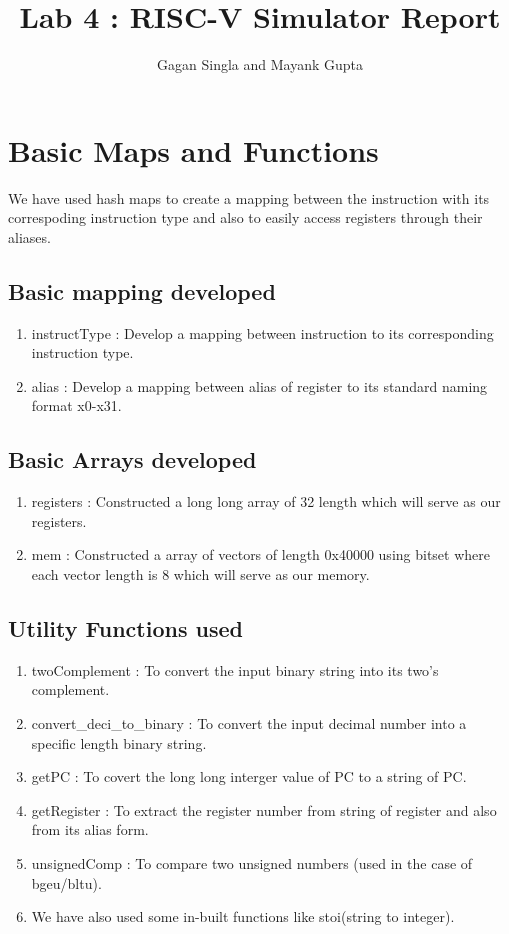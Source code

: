 \documentclass{article}
\begin{document}
\title{
	Lab 4 : RISC-V Simulator Report
}
\author{ Gagan Singla and Mayank Gupta  
}
\maketitle
	\section{Basic Maps and Functions}
	We have used hash maps to create a mapping between the instruction with its correspoding instruction type and also to easily access registers through their aliases.
	\subsection{Basic mapping developed}
	\begin{enumerate}
		\item instructType : Develop a mapping between instruction to its corresponding instruction type.
		\item alias : Develop a mapping between alias of register to its standard naming format x0-x31.
	\end{enumerate}
	\subsection{Basic Arrays developed}
	\begin{enumerate}
		\item registers : Constructed a long long array of 32 length which will serve as our registers.
		\item mem : Constructed a array of vectors of length 0x40000 using bitset where each vector length is 8 which will serve as our memory. 
	\end{enumerate}
	\subsection{Utility Functions used}
	\begin{enumerate}
		\item twoComplement : To convert the input binary string into its two's complement.
		\item convert\_deci\_to\_binary : To convert the input decimal number into a specific length binary string.
		\item getPC : To covert the long long interger value of PC to a string of PC.
		\item getRegister : To extract the register number from string of register and also from its alias form.
		\item unsignedComp : To compare two unsigned numbers (used in the case of bgeu/bltu).
		\item We have also used some in-built functions like stoi(string to integer). 
	\end{enumerate}
\end{document}
